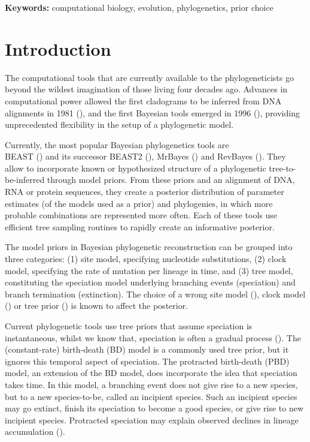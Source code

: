 \documentclass{article}
\begin{document}
{\bf Keywords:} computational biology, evolution, phylogenetics, prior choice

\section{Introduction}

The computational tools that are currently available 
to the phylogeneticists go beyond the wildest 
imagination of those living four decades ago.
Advances in computational power allowed the first cladograms to be inferred 
from DNA alignments in 1981 (\cite{felsenstein1981}), and  
the first Bayesian tools emerged in 1996 (\cite{rannala1996}),
providing unprecedented flexibility in the setup of a phylogenetic model.

Currently, the most popular Bayesian phylogenetics tools are \\ 
BEAST (\cite{beast}) and its successor BEAST2 (\cite{beast2}), 
MrBayes (\cite{mrbayes}) and RevBayes (\cite{revbayes}). 
They allow to incorporate known or hypothesized structure of a phylogenetic 
tree-to-be-inferred through model priors. 
From these priors and an alignment of DNA, RNA or protein sequences, 
they create a posterior distribution
of parameter estimates (of the models used as a prior) and phylogenies, 
in which more probable combinations are represented more often.
Each of these tools use efficient tree sampling routines to rapidly create an 
informative posterior.

The model priors in Bayesian phylogenetic reconstruction 
can be grouped into three categories: (1) site model, specifying 
nucleotide substitutions, (2) clock model, specifying
the rate of mutation per lineage in time, and (3) tree model, 
constituting the speciation model underlying branching events (speciation) 
and branch termination (extinction).
The choice of a wrong site model (\cite{posada_and_buckley_2004}), 
clock model (\cite{baele_et_al_2012}) 
or tree prior (\cite{moller2018, yang_and_ranalla_2005}) is known to affect
the posterior.

Current phylogenetic tools use tree priors 
that assume speciation is instantaneous, whilst we know that, 
speciation is often a gradual process (\cite{schluter2009}).
The (constant-rate) birth-death (BD) model is a commonly 
used tree prior, but it ignores this temporal aspect of speciation.
The protracted birth-death (PBD) model, an extension of 
the BD model, does incorporate the idea that speciation takes time.
In this model, a branching event does not give rise to a new species, but to
a new species-to-be, called an incipient species. Such an incipient
species may go extinct, finish its speciation to become a good species, or give
rise to new incipient species. Protracted speciation may explain observed 
declines in lineage accumulation (\cite{etienne_and_rosindell_2012}).
\end{document}
